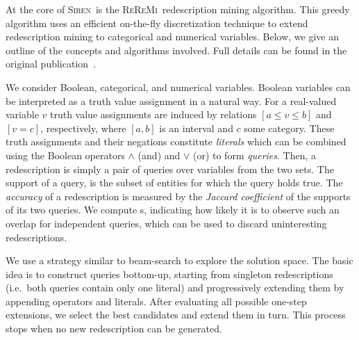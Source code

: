\documentclass{sig-alternate}
\newcommand{\Siren}{\textsc{Siren}}
\newcommand{\ReReMi}{\textsc{ReReMi}}
\begin{document}
At the core of \Siren\ is the \ReReMi\ redescription mining
algorithm. This greedy algorithm uses an efficient on-the-fly
discretization technique to extend redescription mining to categorical
and numerical variables.  Below, we give an outline of the concepts and
algorithms involved. Full details can be found
in the original publication~\cite{galbrun11black}.

We consider Boolean, categorical, and numerical variables. Boolean
variables can be interpreted as a truth value assignment in a natural
way.  For a real-valued variable $v$ truth value assignments are
induced by relations $[a \leq v \leq b]$ and $[v=c]$, respectively,
where $[a, b]$ is an interval and $c$ some category.  These truth
assignments and their negations constitute \emph{literals} which can
be combined using the Boolean operators $\land$ (and) and $\lor$ (or)
to form \emph{queries}.  Then, a redescription is simply a pair of
queries over variables from the two sets.  The support of a query, is
the subset of entities for which the query holds true.  The
\emph{accuracy} of a redescription is measured by the \emph{Jaccard
  coefficient} of the supports of its two queries. We compute
\pValue{}s, indicating how likely it is to observe such an overlap for
independent queries, which can be used to discard uninteresting
redescriptions.

We use a strategy similar to beam-search to explore the
solution space.  The basic idea is to construct queries bottom-up,
starting from singleton redescriptions (i.e.\ both queries contain
only one literal) and progressively extending them by appending
operators and literals. %
After evaluating all
possible one-step extensions, we select the best candidates and extend
them in turn. This process stops when no new redescription can
be generated.
\end{document}
